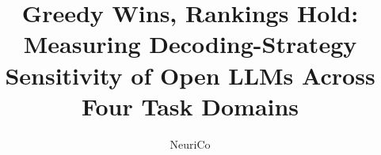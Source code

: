 \documentclass{article}
\title{Greedy Wins, Rankings Hold: Measuring Decoding-Strategy Sensitivity of Open LLMs Across Four Task Domains}
\author{NeuriCo}
\begin{document}
\maketitle

\begin{abstract}

\end{abstract}










\appendix

\end{document}

